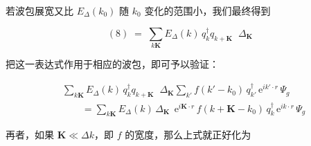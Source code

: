 若波包展宽又比 $E_{\Delta}(k_{0})$ 随 $k_{0}$ 变化的范围小，我们最终得到

\begin{equation*}
(8) \;=\; \sum_{k\mathbf{K}} E_{\Delta}(k)\, q_{k}^{\dagger} q_{k+\mathbf{K}}\;\; \Delta_{\mathbf{K}}
\tag{9}
\end{equation*}

把这一表达式作用于相应的波包，即可予以验证：

\begin{align*}
& \sum_{k\mathbf{K}} E_{\Delta}(k)\, q_{k}^{\dagger} q_{k+\mathbf{K}}\;\; \Delta_{\mathbf{K}} \sum_{k'} f(k'-k_{0})\, q_{k'}^{\dagger}\, \mathrm{e}^{ik'\cdot r}\, \Psi_{g} \\
& \qquad = \sum_{k\mathbf{K}} E_{\Delta}(k)\, \Delta_{\mathbf{K}}\;\, \mathrm{e}^{i\mathbf{K}\cdot r}\, f(k+\mathbf{K}-k_{0})\, q_{k}^{\dagger}\, \mathrm{e}^{ik\cdot r}\, \Psi_{g}
\end{align*}

再者，如果 $\mathbf{K}\ll\Delta k$，即 $f$ 的宽度，那么上式就正好化为